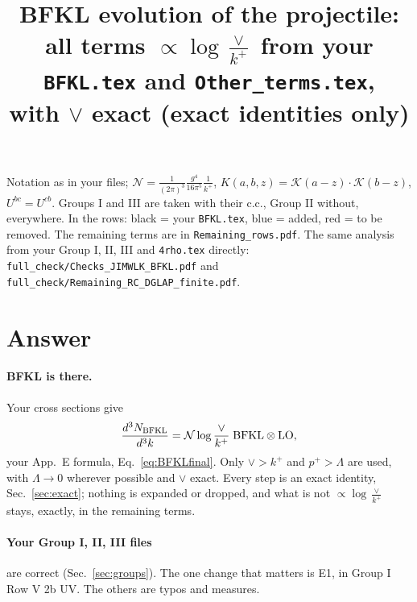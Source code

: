 \documentclass[10pt]{article}
\title{BFKL evolution of the projectile:\\ all terms $\propto\log\frac{\vee}{k^+}$ from your \texttt{BFKL.tex} and \texttt{Other\_terms.tex},\\ with $\vee$ exact (exact identities only)}
\date{}
\numberwithin{equation}{section}
\newcommand{\new}[1]{{\color{blue}#1}}
\newcommand{\old}[1]{{\color{red}#1}}
\begin{document}
\maketitle
\noindent Notation as in your files; $\mathcal N=\frac{1}{(2\pi)^3}\frac{g^4}{16\pi^5}\frac{1}{k^+}$, $K(a,b,z)=\mathcal K(a-z)\cdot\mathcal K(b-z)$, $U^{bc}=U^{cb}$. Groups I and III are taken with their c.c., Group II without, everywhere. In the rows: black = your \texttt{BFKL.tex}, \new{blue} = added, \old{red} = to be removed. The remaining terms are in \texttt{Remaining\_rows.pdf}. The same analysis from your Group I, II, III and \texttt{4rho.tex} directly: \texttt{full\_check/Checks\_JIMWLK\_BFKL.pdf} and \texttt{full\_check/Remaining\_RC\_DGLAP\_finite.pdf}.

\section{Answer}\label{sec:answer}
\paragraph{BFKL is there.} Your cross sections give
\begin{equation}
\frac{d^3N_{\rm BFKL}}{d^3k}=\mathcal N\log\frac{\vee}{k^+}\;{\rm BFKL}\otimes{\rm LO},
\end{equation}
your App.~E formula, Eq.~\eqref{eq:BFKLfinal}. Only $\vee>k^+$ and $p^+>\Lambda$ are used, with $\Lambda\to0$ wherever possible and $\vee$ exact. Every step is an exact identity, Sec.~\ref{sec:exact}; nothing is expanded or dropped, and what is not $\propto\log\frac{\vee}{k^+}$ stays, exactly, in the remaining terms.

\paragraph{Your Group I, II, III files} are correct (Sec.~\ref{sec:groups}). The one change that matters is E1, in Group I Row V 2b UV. The others are typos and measures.
\end{document}
